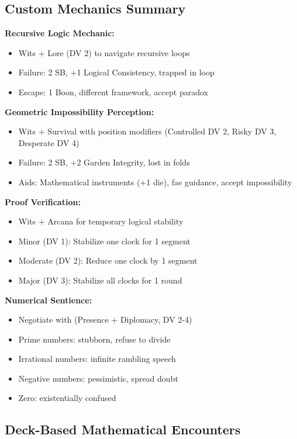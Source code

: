 \documentclass[11pt]{article}
\begin{document}
\subsection*{Custom Mechanics Summary}

\textbf{Recursive Logic Mechanic:}
\begin{itemize}
\item Wits + Lore (DV 2) to navigate recursive loops
\item Failure: 2 SB, +1 Logical Consistency, trapped in loop
\item Escape: 1 Boon, different framework, accept paradox
\end{itemize}

\textbf{Geometric Impossibility Perception:}
\begin{itemize}
\item Wits + Survival with position modifiers (Controlled DV 2, Risky DV 3, Desperate DV 4)
\item Failure: 2 SB, +2 Garden Integrity, lost in folds
\item Aids: Mathematical instruments (+1 die), fae guidance, accept impossibility
\end{itemize}

\textbf{Proof Verification:}
\begin{itemize}
\item Wits + Arcana for temporary logical stability
\item Minor (DV 1): Stabilize one clock for 1 segment
\item Moderate (DV 2): Reduce one clock by 1 segment
\item Major (DV 3): Stabilize all clocks for 1 round
\end{itemize}

\textbf{Numerical Sentience:}
\begin{itemize}
\item Negotiate with (Presence + Diplomacy, DV 2-4)
\item Prime numbers: stubborn, refuse to divide
\item Irrational numbers: infinite rambling speech
\item Negative numbers: pessimistic, spread doubt
\item Zero: existentially confused
\end{itemize}

\subsection*{Deck-Based Mathematical Encounters}
\end{document}
